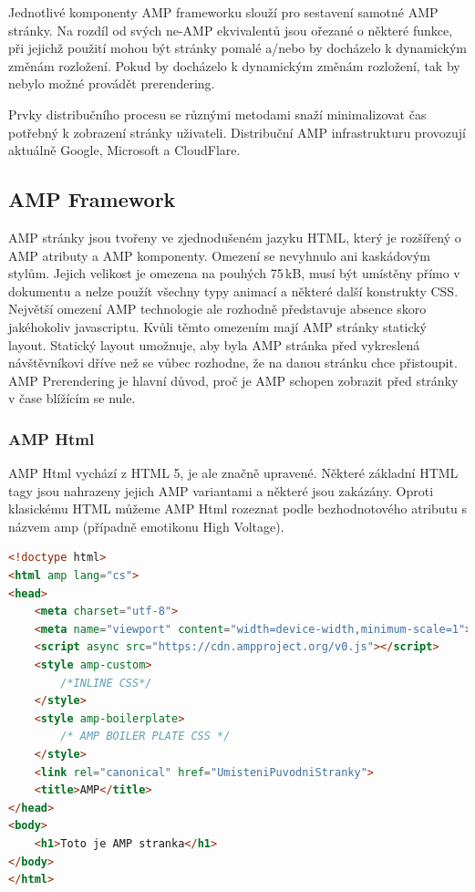 Jednotlivé komponenty AMP frameworku slouží pro sestavení samotné AMP stránky. Na rozdíl od svých
ne-AMP ekvivalentů jsou ořezané o některé funkce, při jejichž použití mohou být stránky pomalé a/nebo
by docházelo k dynamickým změnám rozložení. Pokud by docházelo k dynamickým změnám rozložení,
tak by nebylo možné provádět prerendering.


Prvky distribučního procesu se různými metodami snaží minimalizovat čas potřebný k zobrazení stránky
uživateli. Distribuční AMP infrastrukturu provozují aktuálně Google, Microsoft a CloudFlare\cite[Ch.\ 1, p.\ 49]{VzhuruDoAMP}.

\subsection*{AMP Framework}
AMP stránky jsou tvořeny ve zjednodušeném jazyku HTML, který je rozšířený o AMP atributy a AMP
komponenty. Omezení se nevyhnulo ani kaskádovým stylům. Jejich velikost je omezena na pouhých
75\,kB, musí být umístěny přímo v dokumentu a nelze použít všechny typy animací a některé další
konstrukty CSS.
Největší omezení AMP technologie ale rozhodně představuje absence skoro jakéhokoliv javascriptu.
Kvůli těmto omezením mají AMP stránky statický layout. Statický layout umožnuje, aby byla AMP stránka před vykreslená návštěvníkovi dříve než se vůbec rozhodne, že na danou stránku chce přistoupit. AMP Prerendering je hlavní důvod, proč je AMP schopen zobrazit před stránky v čase blížícím se nule\cite{AMP-zero}.
\subsubsection*{AMP Html}
AMP Html vychází z HTML 5, je ale značně upravené. Některé základní HTML tagy jsou nahrazeny jejich AMP variantami a některé jsou zakázány.
Oproti klasickému HTML můžeme AMP Html rozeznat podle bezhodnotového atributu s názvem amp (případně emotikonu High Voltage).

\begin{lstlisting}[language=html, caption=Ukázka AMP Html,captionpos=t]
<!doctype html>
<html amp lang="cs">
<head>
    <meta charset="utf-8">
    <meta name="viewport" content="width=device-width,minimum-scale=1">
    <script async src="https://cdn.ampproject.org/v0.js"></script>
    <style amp-custom>
        /*INLINE CSS*/
    </style>
    <style amp-boilerplate>
        /* AMP BOILER PLATE CSS */
    </style>
    <link rel="canonical" href="UmisteniPuvodniStranky">
    <title>AMP</title>
</head>
<body>
    <h1>Toto je AMP stranka</h1>
</body>
</html>

\end{lstlisting}

